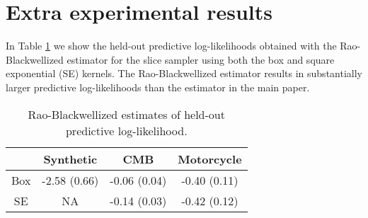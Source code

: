 \documentclass{article} %
\begin{document}
\section{Extra experimental results}

In Table 
\ref{tab:rbpredll} 
we show the held-out predictive log-likelihoods
obtained with the Rao-Blackwellized estimator for the slice sampler using both
the box and square exponential (SE) kernels.  The Rao-Blackwellized estimator 
results in substantially larger predictive log-likelihoods than the estimator in the main paper.

\begin{table}[h]
  \centering
  \caption{Rao-Blackwellized estimates of held-out predictive log-likelihood.}
  \vspace{3pt}
  \begin{tabular}{|c|c|c|c|}
    \hline
    & \textbf{Synthetic} & \textbf{CMB} & \textbf{Motorcycle} \\
    \hline
    Box & -2.58 (0.66) & -0.06 (0.04) & -0.40 (0.11) \\
    \hline
    SE & NA & -0.14 (0.03) & -0.42 (0.12) \\
    \hline
  \end{tabular}
  \label{tab:rbpredll}
\end{table}


%
%
%
%
%
%
%
%
%
%
%
%
%
%
%




\end{document}

